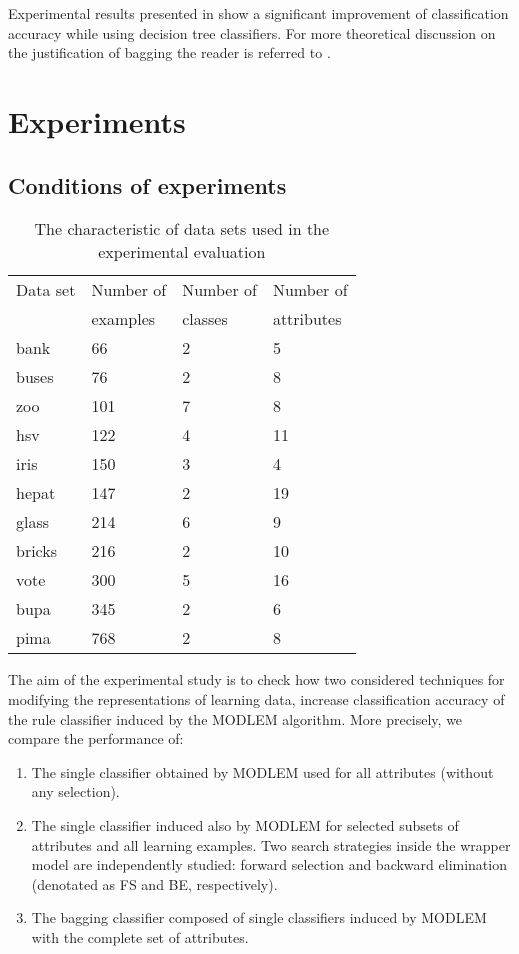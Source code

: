 \documentclass{elsart}
\begin{document}
Experimental results presented in \cite{Bre,BK99} show a
significant improvement of classification accuracy while using
decision tree classifiers. For more theoretical discussion on the
justification of bagging the reader is referred to \cite{Bre}.


\section{Experiments}
\subsection{Conditions of experiments}

\begin{table} \centering
\caption{The characteristic of data sets used in the experimental
evaluation} \label{tab1}
\begin{tabular}{llll}
\hline
 Data set & Number of & Number of & Number of \\
 & examples & classes & attributes \\ \hline
 bank & 66 & 2 & 5 \\
buses & 76 & 2 & 8 \\ zoo &  101 & 7 & 8\\ hsv & 122 & 4 & 11\\ iris & 150 &
3 & 4
\\hepat & 147 & 2 & 19
\\ glass & 214 & 6 & 9
\\ bricks & 216 & 2 & 10 \\
 vote & 300 & 5
& 16 \\ bupa & 345 & 2 & 6 \\
 pima &  768 & 2 & 8 \\
\hline
\end{tabular}
\end{table}


The aim of the experimental study is to check how two considered techniques
for modifying the representations of learning data, increase classification
accuracy of the rule classifier induced by the MODLEM algorithm. More
precisely, we compare the performance of:
\begin{enumerate}
\item The single classifier obtained by MODLEM used for all attributes (without any
selection).
\item The single classifier induced also by MODLEM for selected subsets of
attributes and all learning examples. Two search strategies inside the
wrapper model are independently studied: forward selection and backward
elimination (denotated as FS and BE, respectively).
\item The bagging classifier composed of single classifiers induced by MODLEM
with the complete set of attributes.
\end{enumerate}
\end{document}
